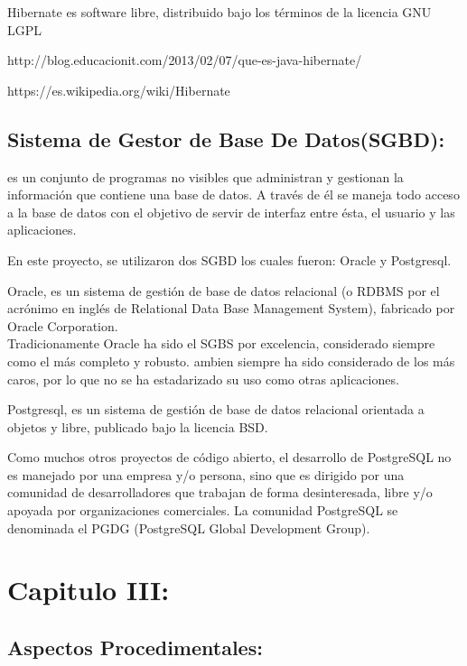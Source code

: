 \documentclass[spanish]{article}
\begin{document}
Hibernate es software libre, distribuido bajo los términos de la licencia GNU LGPL

http://blog.educacionit.com/2013/02/07/que-es-java-hibernate/

https://es.wikipedia.org/wiki/Hibernate


\subsection{Sistema de Gestor de Base De Datos(SGBD):}

es un conjunto de programas no visibles que administran y gestionan la información que contiene una base de datos. A través de él se maneja todo acceso a la base de datos con el objetivo de servir de interfaz entre ésta, el usuario y las aplicaciones.

En este proyecto, se utilizaron dos SGBD los cuales fueron: Oracle y Postgresql.

Oracle, es un sistema de gestión de base de datos relacional (o RDBMS por el acrónimo en inglés de Relational Data Base Management System), fabricado por Oracle Corporation.
\\
 Tradicionamente Oracle ha sido el SGBS por excelencia, considerado siempre como el más completo y robusto. ambien siempre ha sido considerado de los más caros, por lo que no se ha estadarizado su uso como otras aplicaciones.
 
 Postgresql, es un sistema de gestión de base de datos relacional orientada a objetos y libre, publicado bajo la licencia BSD.
 
 Como muchos otros proyectos de código abierto, el desarrollo de PostgreSQL no es manejado por una empresa y/o persona, sino que es dirigido por una comunidad de desarrolladores que trabajan de forma desinteresada, libre y/o apoyada por organizaciones comerciales. La comunidad PostgreSQL se denominada el PGDG (PostgreSQL Global Development Group).
 

\section{Capitulo III:}

\subsection{Aspectos Procedimentales:}
\end{document}
